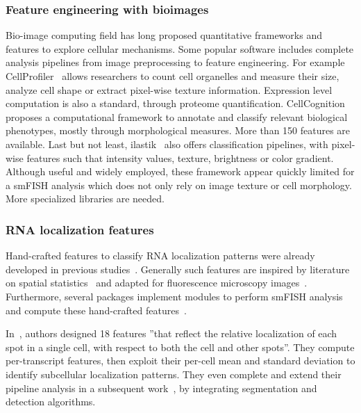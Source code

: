 \subsubsection{Feature engineering with bioimages}

Bio-image computing field has long proposed quantitative frameworks and features to explore cellular mechanisms.
Some popular software includes complete analysis pipelines from image preprocessing to feature engineering.
For example CellProfiler~\cite{mcquin_cellprofiler_2018} allows researchers to count cell organelles and measure their size, analyze cell shape or extract pixel-wise texture information.
Expression level computation is also a standard, through proteome quantification.
CellCognition~\cite{held_cellcognition_2010} proposes a computational framework to annotate and classify relevant biological phenotypes, mostly through morphological measures.
More than 150 features are available.
Last but not least, ilastik~\cite{berg_ilastik_2019} also offers classification pipelines, with pixel-wise features such that intensity values, texture, brightness or color gradient.
Although useful and widely employed, these framework appear quickly limited for a \ac{smFISH} analysis which does not only rely on image texture or cell morphology.
More specialized libraries are needed.

\subsubsection{\ac{RNA} localization features}

Hand-crafted features to classify \ac{RNA} localization patterns were already developed in previous studies~\cite{battich_image-based_2013,samacoits_computational_2018}.
Generally such features are inspired by literature on spatial statistics~\cite{ripley2005spatial} and adapted for fluorescence microscopy images~\cite{lagache_statistical_2015,stueland_rdi_2019}.
Furthermore, several packages implement modules to perform \ac{smFISH} analysis and compute these hand-crafted features~\cite{mueller_fish-quant_2013,savulescu_dypfish_2019,mah_bento_2022}.

In~\cite{battich_image-based_2013}, authors designed 18 features ''that reflect the relative localization of each spot in a single cell, with respect to both the cell and other spots''.
They compute per-transcript features, then exploit their per-cell mean and standard deviation to identify subcellular localization patterns.
They even complete and extend their pipeline analysis in a subsequent work~\cite{stoeger_computer_2015}, by integrating segmentation and detection algorithms.


